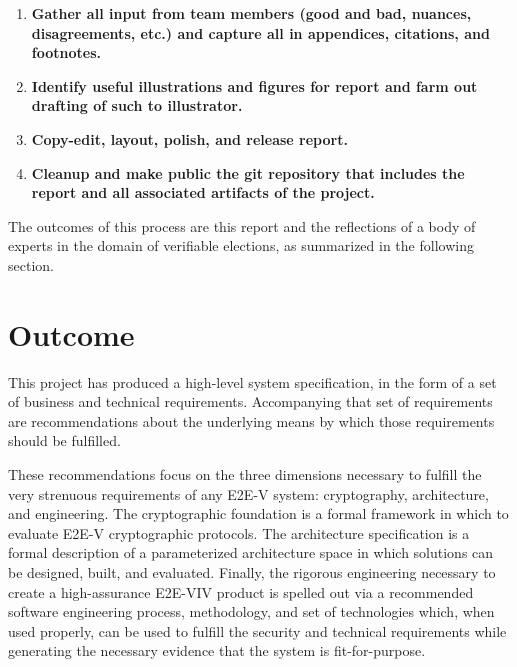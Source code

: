 \begin{enumerate}
{    on feasibility of Part 2 potential recommendations.}
\item \textbf{Gather all input from team members (good and bad,
    nuances, disagreements, etc.) and capture all in appendices,
    citations, and footnotes.}
\item \textbf{Identify useful illustrations and figures for report and
    farm out drafting of such to illustrator.}
\item \textbf{Copy-edit, layout, polish, and release report.}
\item \textbf{Cleanup and make public the git repository that includes
  the report and all associated artifacts of the project.}
\end{enumerate}

The outcomes of this process are this report and the reflections of a
body of experts in the domain of verifiable elections, as summarized
in the following section.

\section{Outcome}
\label{sec:outcome}

This project has produced a high-level system specification, in the
form of a set of business and technical requirements.  Accompanying
that set of requirements are recommendations about the underlying
means by which those requirements should be fulfilled.  

These recommendations focus on the three dimensions necessary to
fulfill the very strenuous requirements of any E2E-V system:
cryptography, architecture, and engineering.  The cryptographic
foundation is a formal framework in which to evaluate E2E-V
cryptographic protocols.  The architecture specification is a formal
description of a parameterized architecture space in which solutions
can be designed, built, and evaluated.  Finally, the rigorous
engineering necessary to create a high-assurance E2E-VIV product is
spelled out via a recommended software engineering process,
methodology, and set of technologies which, when used properly, can be
used to fulfill the security and  technical requirements
while generating the necessary evidence that the system is
fit-for-purpose.

